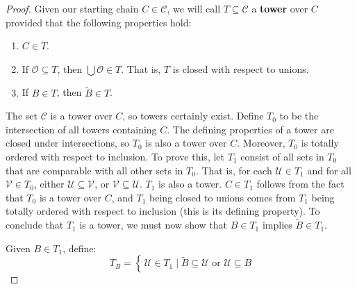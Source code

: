 \documentclass{article}
\theoremstyle{definition}
\newcommand*{\twiddle}[1]{%
    \tilde{#1}
}
\begin{document}
\begin{proof}
                \par\hfill\par
                Given our starting chain $C\in\mathcal{C}$, we will call
                $T\subseteq\mathcal{C}$ a \textbf{tower} over $C$ provided
                that the following properties hold:
                \begin{enumerate}
                    \item
                        $C\in{T}$.
                    \item
                        If $\mathcal{O}\subseteq{T}$, then
                        $\bigcup\mathcal{O}\in{T}$. That is, $T$ is closed
                        with respect to unions.
                    \item
                        If $B\in{T}$, then $\twiddle{B}\in{T}$.
                \end{enumerate}
                The set $\mathcal{C}$ is a tower over $C$, so towers certainly
                exist. Define $T_{0}$ to be the intersection of all towers
                containing $C$. The defining properties of a tower are closed
                under intersections, so $T_{0}$ is also a tower over $C$.
                Moreover, $T_{0}$ is totally ordered with respect to inclusion.
                To prove this, let $T_{1}$ consist of all sets in $T_{0}$ that
                are comparable with all other sets in $T_{0}$. That is, for
                each $\mathcal{U}\in{T}_{1}$ and for all
                $\mathcal{V}\in{T}_{0}$, either
                $\mathcal{U}\subseteq\mathcal{V}$,
                or $\mathcal{V}\subseteq\mathcal{U}$. $T_{1}$ is also a tower.
                $C\in{T}_{1}$ follows from the fact that $T_{0}$ is a tower
                over $C$, and $T_{1}$ being closed to unions comes
                from $T_{1}$ being totally ordered with respect to inclusion
                (this is its defining property). To conclude that $T_{1}$ is a
                tower, we must now show that $B\in{T}_{1}$ implies
                $\twiddle{B}\in{T}_{1}$.
                \par\hfill\par
                Given $B\in{T}_{1}$, define:
                \begin{equation}
                    T_{B}=\left\{\,
                        \mathcal{U}\in{T}_{1}
                        \;\big|\;
                        \twiddle{B}\subseteq\mathcal{U}
                        \textrm{ or }
                        \mathcal{U}\subseteq{B}

\end{equation}
\end{proof}
\end{document}
